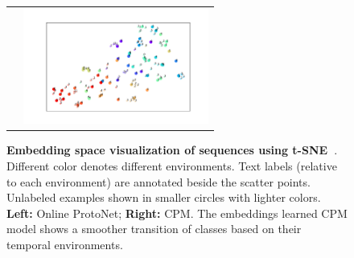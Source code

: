 \begin{figure}[t]
\begin{tabular}{cc}
    &
    \includegraphics[height=3.8cm, trim={2.5cm 1cm 2cm 1cm}, clip]{figures/omniglot-cpm-tsne/tsne-008.pdf}
    \end{tabular}
\fi
\caption{\textbf{Embedding space visualization of \ourchar{} sequences using t-SNE~\citep{tsne}}. Different color
denotes different environments. Text labels (relative to each environment) are annotated beside the
scatter points. Unlabeled examples shown in smaller circles with lighter colors. \textbf{Left:}
Online ProtoNet; \textbf{Right:} CPM. The embeddings learned CPM model shows a smoother transition
of classes based on their temporal environments.}
\label{fig:tsne}
\end{figure}

